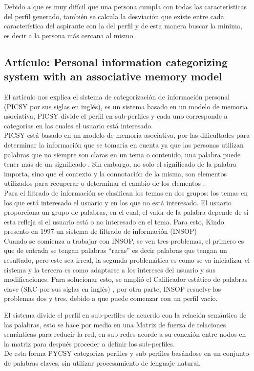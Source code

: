     Debido a que es muy difícil que una persona cumpla con todas las características del perfil generado, también se calcula la desviación que existe entre cada característica del aspirante con la del perfil y de esta manera buscar la mínima, es decir a la persona más cercana al mismo.\cite{DMMDPWPRC}
     \bigskip

\subsection{Artículo: Personal information categorizing system with an associative memory model }
    El artículo nos explica el sistema de categorización de información personal (PICSY por sus siglas en inglés\cite{PICSY}), es un sistema basado en un modelo de memoria asociativa, PICSY divide el perfil en sub-perfiles y cada uno corresponde a categorías en las cuales el usuario está interesado.\\
    
    PICSY está basado en un modelo de memoria asociativa, por las dificultades para determinar la información que se tomaría en cuenta ya que las personas utilizan palabras que no siempre son claras en un tema o contenido, una palabra puede tener más de un significado \cite{PICSY2}. Sin embargo, no solo el significado de la palabra importa, sino que el contexto y la connotación de la misma, son elementos utilizados para recuperar o determinar el cambio de los elementos \cite{PICSY3}.\\
    
    Para el filtrado de información se clasifican los temas en dos grupos: los temas en los que está interesado el usuario y en los que no está interesado. El usuario proporciona un grupo de palabras, en el cual, el valor de la palabra depende de si esta refleja si el usuario está o no interesado en el tema. Para esto, Kindo presento en 1997 un sistema de filtrado de información (INSOP) \cite{PICSY3} \\
    
    Cuando se comienza a trabajar con INSOP, se ven tres problemas, el primero es que de entrada se tengan palabras ``raras'' es decir palabras que tengan un resultado, pero este sea irreal, la segunda problemática es como se va inicializar el sistema y la tercera es como adaptarse a los intereses del usuario y sus modificaciones. Para solucionar esto, se amplió el Calificador estático de palabras clave (SKC por sus siglas en inglés) \cite{PICSY}, por otra parte, INSOP resuelve los problemas dos y tres, debido a que puede comenzar con un perfil vacío.
        
    El sistema divide el perfil en sub-perfiles de acuerdo con la relación semántica de las palabras, esto se hace por medio en una Matriz de fuerza de relaciones semánticas para reducir la red, en sub-redes acorde a su conexión entre nodos en la matriz para después proceder a definir los sub-perfiles.\\
    
    De esta forma PYCSY categoriza perfiles y sub-perfiles basándose en un conjunto de palabras claves, sin utilizar procesamiento de lenguaje natural.
 \bigskip
    
    
    


